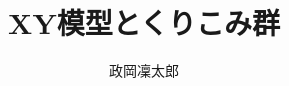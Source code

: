 \documentclass[12pt]{ltjsarticle}
\begin{document}
\title{XY模型とくりこみ群}
\author{政岡凜太郎}
\date{}
\maketitle


\end{document}
